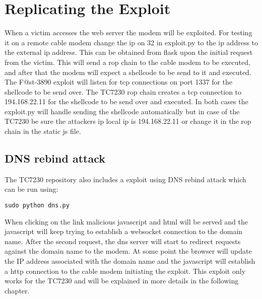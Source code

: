 \section{Replicating the Exploit}
When a victim accesses the web server the modem will be exploited. For testing it on a remote cable modem change the ip on 32 in exploit.py to the ip address to the external ip address. This can be obtained from flask upon the initial request from the victim. 
This will send a rop chain to the cable modem to be executed, and after that the modem will expect a shellcode to be send to it and executed. The F@st-3890 exploit will listen for tcp connections on port 1337 for the shellcode to be send over. The TC7230 rop chain creates a tcp connection to 194.168.22.11 for the shellcode to be send over and executed.
In both cases the exploit.py will handle sending the shellcode automatically but in case of the TC7230 be sure the attackers ip local ip is 194.168.22.11 or change it in the rop chain in the static js file.

\subsection{DNS rebind attack}
The TC7230 repository also includes a exploit using DNS rebind attack which can be run using:

\begin{lstlisting}[numbers=none]
    sudo python dns.py
\end{lstlisting}

When clicking on the link malicious javascript and html will be served and the javascript will keep trying to establish a websocket connection to the domain name. 
After the second request, the dns server will start to redirect requests against the domain name to the modem. 
At some point the browser will update the IP address associated with the domain name and the javascript will establish a http connection to the cable modem initiating the exploit.
This exploit only works for the TC7230 and will be explained in more details in the following chapter.